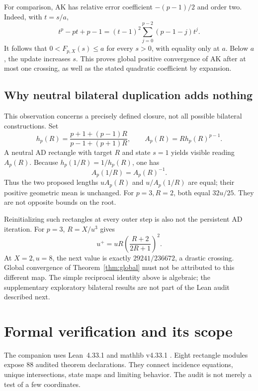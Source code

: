\documentclass[11pt,a4paper]{article}
\theoremstyle{remark}\newtheorem{remark}[theorem]{Remark}
\numberwithin{equation}{section}
\newcommand{\AK}{F_{p,X}}
\begin{document}
For comparison, AK has relative error coefficient $-(p-1)/2$ and order two. Indeed, with $t=s/a$,
\begin{equation}
 t^p-pt+p-1=(t-1)^2\sum_{j=0}^{p-2}(p-1-j)t^j.
\end{equation}
It follows that $0<\AK(s)\le a$ for every $s>0$, with equality only at $a$. Below $a$, the update increases $s$. This proves global positive convergence of AK after at most one crossing, as well as the stated quadratic coefficient by expansion.

\subsection{Why neutral bilateral duplication adds nothing}
This observation concerns a precisely defined closure, not all possible bilateral constructions. Set
\begin{equation}
 h_p(R)=\frac{p+1+(p-1)R}{p-1+(p+1)R},\qquad A_p(R)=R h_p(R)^{p-1}.
\end{equation}
A neutral AD rectangle with target $R$ and state $s=1$ yields visible reading $A_p(R)$. Because $h_p(1/R)=1/h_p(R)$, one has
\begin{equation}
 A_p(1/R)=A_p(R)^{-1}.
\end{equation}
Thus the two proposed lengths $uA_p(R)$ and $u/A_p(1/R)$ are equal; their positive geometric mean is unchanged. For $p=3,R=2$, both equal $32u/25$. They are not opposite bounds on the root.

Reinitializing such rectangles at every outer step is also not the persistent AD iteration. For $p=3$, $R=X/u^3$ gives
\begin{equation}
 u^+=uR\left(\frac{R+2}{2R+1}\right)^2.
\end{equation}
At $X=2,u=8$, the next value is exactly $29241/236672$, a drastic crossing. Global convergence of Theorem~\ref{thm:global} must not be attributed to this different map. The simple reciprocal identity above is algebraic; the supplementary exploratory bilateral results are not part of the Lean audit described next.

\section{Formal verification and its scope}\label{sec:formal}
The companion uses Lean~4.33.1 and mathlib v4.33.1 \citep{lean4,mathlib}. Eight rectangle modules expose 88 audited theorem declarations. They connect incidence equations, unique intersections, state maps and limiting behavior. The audit is not merely a test of a few coordinates.
\end{document}
